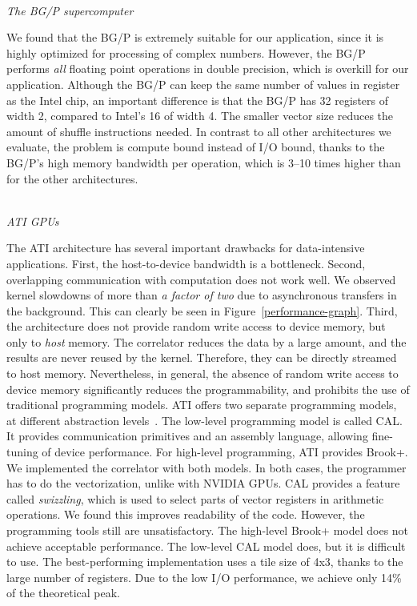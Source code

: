\documentclass{article}
\begin{document}
\noindent \\ \emph{The BG/P supercomputer}

\noindent 
We found that the BG/P is extremely suitable for our application,
since it is highly optimized for processing of complex numbers.
However, the BG/P performs \emph{all} floating point operations in double
precision, which is overkill for our application.
Although the BG/P can keep the same number of values in register as the 
Intel chip, an important difference is that the BG/P has 32
registers of width 2, compared to Intel's 16 of width 4.  The smaller
vector size reduces the amount of shuffle instructions needed.
In contrast to all other architectures we evaluate, the problem is compute
bound instead of I/O bound, thanks to the BG/P's high memory bandwidth per
operation, which is 3--10 times higher than for the other architectures.


\noindent \\ \emph{ATI GPUs}

\noindent The ATI architecture has several important
drawbacks for data-intensive applications.  First, the
host-to-device bandwidth is a bottleneck.  Second, 
overlapping communication with computation does not work well.
We observed kernel slowdowns of more than \emph{a factor of
two} due to asynchronous transfers in the background. This can clearly be seen in Figure~\ref{performance-graph}.
Third, the architecture does not provide random write access to device
memory, but only to \emph{host} memory.
The correlator reduces the data by a large amount, and the
results are never reused by the kernel. Therefore, they can be
directly streamed to host memory. Nevertheless, in general, the absence of random
write access to device memory significantly reduces the programmability, and prohibits the use
of traditional programming models.
ATI offers two separate programming models, at different abstraction
levels~\cite{amd-manual}.  The low-level programming model is called CAL.  
It provides communication primitives and
an assembly language, allowing fine-tuning of device
performance. For high-level programming, ATI provides Brook+.  We
implemented the correlator with both models.
In both cases, the programmer has to do the vectorization,
unlike with NVIDIA GPUs.  CAL provides a feature called
\emph{swizzling}, which is used to select parts of vector registers in
arithmetic operations.  We found this improves readability of the code. 
However, the
programming tools still are unsatisfactory. The high-level Brook+ model does
not achieve acceptable performance. The low-level
CAL model does, but it is difficult to use.
The best-performing implementation uses a tile size of 4x3, thanks to
the large number of registers.  
Due to the low I/O performance, we achieve only 14\% of the theoretical peak.
\end{document}
